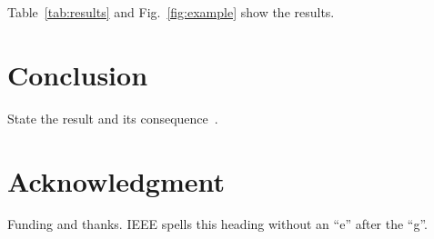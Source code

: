 \documentclass[conference]{IEEEtran}
\begin{document}
Table~\ref{tab:results} and Fig.~\ref{fig:example} show the results.

\section{Conclusion}
State the result and its consequence~\cite{einstein1905}.

\section*{Acknowledgment}
Funding and thanks. IEEE spells this heading without an ``e'' after the ``g''.



\end{document}
